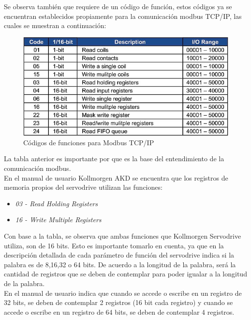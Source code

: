 \documentclass[12pt,titlepage]{article}
\begin{document}
Se observa también que requiere de un código de función, estos códigos ya se encuentran establecidos propiamente para la comunicación modbus TCP/IP, las cuales se muestran a continuación: \\ 

 \begin{figure}[htbp]
\hspace*{1.9cm} 
\includegraphics[scale=0.68]{function_code}
\caption{Códigos de funciones para Modbus TCP/IP }
\end{figure}

La tabla anterior es importante por que es la base del entendimiento de la comunicación modbus. \\

En el manual de usuario Kollmorgen AKD se encuentra que los registros de memoria propios del servodrive utilizan las funciones: \\

\begin{itemize}
\item \textit{03 - Read Holding Registers}
\item \textit{16 - Write Multiple Registers\\} 
\end{itemize}


Con base  a la tabla, se observa que  ambas funciones que Kollmorgen Servodrive utiliza, son de 16 bits. Esto es importante tomarlo en cuenta, ya que en la descripción detallada de cada parámetro de función del servodrive indica si la palabra es de 8,16,32 o 64 bits. De acuerdo a la longitud de la palabra, será la cantidad de registros que se deben de contemplar para poder igualar a la longitud de la palabra. \\
\newpage
En el manual de usuario indica que cuando se accede o escribe en un registro de 32 bits, se deben de contemplar 2 registros (16 bit cada registro) y cuando se accede o escribe en un registro de 64 bits, se deben de contemplar 4 registros.\\
\end{document}
